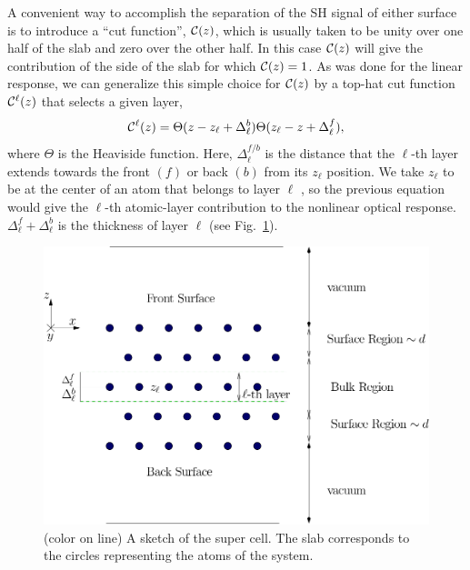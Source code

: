 \documentclass[floatfix,prb,aps,superscriptaddress,11pt,preprint,letterpaper]{revtex4}
\def\chon{red}
\begin{document}
A convenient way to accomplish the separation of the SH signal of
either surface is to introduce a ``cut function'', ${\mathbf{\cal C}}(z)$, which is 
usually taken to be unity over one half of the slab and zero over 
the other half.\cite{reiningPRB94}
In this case ${\mathbf{\cal C}}(z)$ will give the contribution of the 
side of the slab for which ${\mathbf{\cal C}}(z)=1$. 
As was done for the linear response,\cite{mendozaPRB06}
we can generalize this 
simple choice for ${\mathbf{\cal C}}(z)$ by a top-hat cut function
${\mathbf{\cal C}}^\ell(z)$ that selects a given layer,
\begin{equation}
\label{sz}
{\mathbf{\cal C}}^\ell(z)=\Theta(z-z_\ell+\Delta_\ell^{b})  
            \Theta(z_\ell-z+\Delta_\ell^f),
\end{equation} 
where $\Theta$ is the Heaviside function. Here, $\Delta_\ell^{f/b}$
is the distance that the $\ell$-th layer extends towards the front
$(f)$ or back $(b)$ from its $z_\ell$ position. 
We take $z_\ell$ {\color{\chon} to be} at the center of an atom that 
belongs to layer $\ell${\color{\chon} , so the previous} 
equation would give the $\ell$-th atomic-layer 
contribution to the {\color{\chon} nonlinear} optical response.
$\Delta_\ell^f+\Delta_\ell^b$ is the thickness of layer $\ell$ 
(see Fig.~\ref{fslab}).
\begin{figure}
\centering
\includegraphics[scale=.7]{images/slab}
\caption{(color on line) A sketch of the super {\color{\chon} cell. 
The} slab corresponds to the
circles representing the atoms of the system.\label{fslab}} 
\end{figure}
\end{document}

